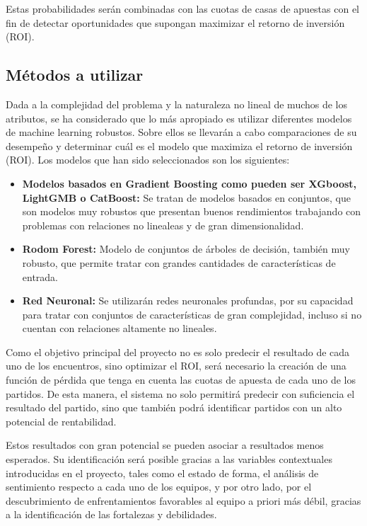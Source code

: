 Estas probabilidades serán combinadas con las cuotas de casas de apuestas con el fin de detectar oportunidades que supongan maximizar el retorno de inversión (ROI).

\subsection{Métodos a utilizar}

Dada a la complejidad del problema y la naturaleza no lineal de muchos de los atributos, se ha considerado que lo más apropiado es utilizar diferentes modelos de machine learning robustos. Sobre ellos se llevarán a cabo comparaciones de su desempeño y determinar cuál es el modelo que maximiza el retorno de inversión (ROI). Los modelos que han sido seleccionados son los siguientes:

\begin{itemize}
    \item \textbf{Modelos basados en Gradient Boosting como pueden ser XGboost, LightGMB o CatBoost:} Se tratan de modelos basados en conjuntos, que son modelos muy robustos que presentan buenos rendimientos trabajando con problemas con relaciones no linealeas y de gran dimensionalidad.
    \item \textbf{Rodom Forest:} Modelo de conjuntos de árboles de decisión, también muy robusto, que permite tratar con grandes cantidades de características de entrada.
    \item \textbf{Red Neuronal:} Se utilizarán redes neuronales profundas, por su capacidad para tratar con conjuntos de características de gran complejidad, incluso si no cuentan con relaciones altamente no lineales.
\end{itemize}


Como el objetivo principal del proyecto no es solo predecir el resultado de cada uno de los encuentros, sino optimizar el ROI, será necesario la creación de una función de pérdida que tenga en cuenta las cuotas de apuesta de cada uno de los partidos. De esta manera, el sistema no solo permitirá predecir con suficiencia el resultado del partido, sino que también podrá identificar partidos con un alto potencial de rentabilidad.

Estos resultados con gran potencial se pueden asociar a resultados menos esperados. Su identificación será posible gracias a las variables contextuales introducidas en el proyecto, tales como el estado de forma, el análisis de sentimiento respecto a cada uno de los equipos, y por otro lado, por el descubrimiento de enfrentamientos favorables al equipo a priori más débil, gracias a la identificación de las fortalezas y debilidades.